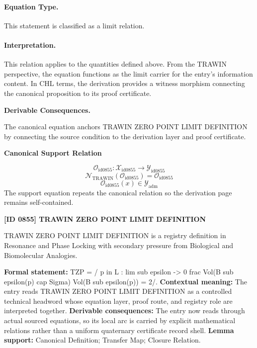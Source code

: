 \paragraph{Equation Type.}
This statement is classified as a limit relation.

\paragraph{Interpretation.}
This relation applies to the quantities defined above. From the TRAWIN perspective, the equation functions as the limit carrier for the entry’s information content. In CHL terms, the derivation provides a witness morphism connecting the canonical proposition to its proof certificate.

\par\vspace{0.35em}
\noindent\textbf{Derivable Consequences.}\quad
\begingroup
\footnotesize
\raggedright
The canonical equation anchors TRAWIN ZERO POINT LIMIT DEFINITION by connecting the source condition to the derivation layer and proof certificate.
\par\endgroup

\noindent\textbf{Canonical Support Relation}\par
\[
\mathcal{O}_{\mathrm{id0855}}:\mathcal{X}_{\mathrm{id0855}}\longrightarrow\mathcal{Y}_{\mathrm{id0855}}
\]
\[
\mathcal{N}_{\mathrm{TRAWIN}}(\mathcal{O}_{\mathrm{id0855}})=\mathcal{O}_{\mathrm{id0855}}
\]
\[
\mathcal{O}_{\mathrm{id0855}}(x)\in\mathcal{Y}_{\mathrm{adm}}
\]
\noindent The support equation repeats the canonical relation so the derivation page remains self-contained.\par

\clearpage
\noindent\textbf{[ID 0855] TRAWIN ZERO POINT LIMIT DEFINITION}\par
\vspace{0.35em}
\begingroup\small
{}
TRAWIN ZERO POINT LIMIT DEFINITION is a registry definition in Resonance and Phase Locking with secondary pressure from Biological and Biomolecular Analogies.

\begingroup\footnotesize\setlength{\emergencystretch}{3em}\sloppy
\textbf{Formal statement:} TZP = / p in L : lim sub epsilon -> 0 frac Vol(B sub epsilon(p) cap Sigma) Vol(B sub epsilon(p)) = 2/. \textbf{Contextual meaning:} The entry reads TRAWIN ZERO POINT LIMIT DEFINITION as a controlled technical headword whose equation layer, proof route, and registry role are interpreted together. \textbf{Derivable consequences:} The entry now reads through actual sourced equations, so its local arc is carried by explicit mathematical relations rather than a uniform quaternary certificate record shell. \textbf{Lemma support:} Canonical Definition; Transfer Map; Closure Relation.\par
\endgroup

